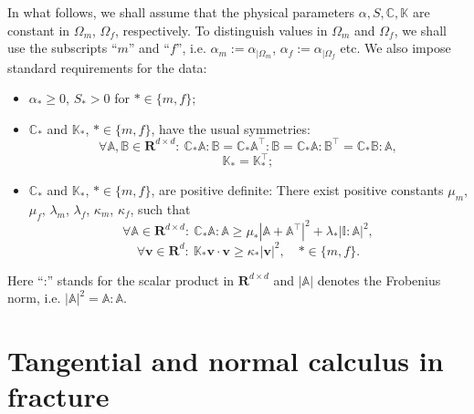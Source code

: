 \documentclass[a4paper]{m2an}
\numberwithin{equation}{section}
\def\CC{\tn C}
\def\Real{{\mathbf R}} %
\def\tn#1{{\mathbb{#1}}}    %
\def\vc#1{\mathbf{#1}}     %
\def\vv{\vc v}
\newcommand{\eq}[1]{\begin{equation}#1\end{equation}}
\newcommand{\eqs}[1]{\begin{equation*}#1\end{equation*}}
\begin{document}
In what follows, we shall assume that the physical parameters $\alpha,S,\CC,\tn K$ are constant in $\Omega_m$, $\Omega_f$, respectively.
To distinguish values in $\Omega_m$ and $\Omega_f$, we shall use the subscripts ``$m$'' and ``$f$'', i.e. $\alpha_m := \alpha_{|\Omega_m}$, $\alpha_f := \alpha_{|\Omega_f}$ etc.
We also impose standard requirements for the data:
\begin{itemize}
\item $\alpha_*\ge 0$, $S_*>0$ for $*\in\{m,f\}$;
\item $\CC_*$ and $\tn K_*$, $*\in\{m,f\}$, have the usual symmetries:
\eqs{ \forall \tn A,\tn B\in\Real^{d\times d}:~ \CC_*\tn A:\tn B=\CC_*\tn A^\top:\tn B=\CC_*\tn A:\tn B^\top=\CC_*\tn B:\tn A, }
\eqs{ \tn K_* = \tn K_*^\top; }
\item $\CC_*$ and $\tn K_*$, $*\in\{m,f\}$, are positive definite: %
There exist positive constants $\mu_m$, $\mu_f$, $\lambda_m$, $\lambda_f$, $\kappa_m$, $\kappa_f$, such that
\eq{ \label{eq:pos_def_C_gen} \forall\tn A\in\Real^{d\times d}:~\CC_*\tn A:\tn A \ge \mu_*\left|\tn A+\tn A^\top\right|^2 + \lambda_*|\tn I:\tn A|^2, }
\eq{ \label{eq:pos_def_K} \forall\vv\in\Real^d:~\tn K_*\vv\cdot\vv \ge \kappa_*|\vv|^2,\quad *\in\{m,f\}. }
\end{itemize}
Here ``:'' stands for the scalar product in $\Real^{d\times d}$ and $|\tn A|$ denotes the Frobenius norm, i.e. $|\tn A|^2=\tn A:\tn A$.




\section{Tangential and normal calculus in fracture}\label{sec:calculus}
\end{document}
